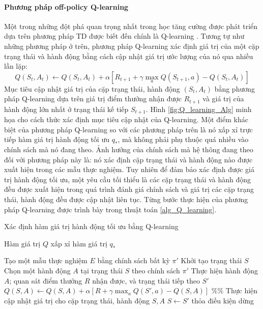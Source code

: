 \paragraph*{Phương pháp off-policy Q-learning}
 Một trong những đột phá quan trọng nhất trong học tăng cường được phát triển dựa trên phương pháp TD được biết đến chính là Q-learning \cite{sutton1998introduction}. Tương tự như những phương pháp ở trên, phương pháp Q-learning xác định giá trị của một cặp trạng thái và hành động bằng cách cập nhật giá trị ước lượng của nó qua nhiều lần lặp:
 \begin{equation}
	 Q(\mathit{S}_t, \mathit{A}_t) \leftarrow Q(\mathit{S}_t, \mathit{A}_t) + \alpha \left[\mathit{R}_{t+1} + \gamma\max_{a}Q(\mathit{S}_{t+1}, a) - Q(\mathit{S}_t, \mathit{A}_t)\right]
 \end{equation}
Mục tiêu cập nhật giá trị của cặp trạng thái, hành động $(\mathit{S}_{t}, \mathit{A}_{t})$ bằng phương pháp Q-learning dựa trên giá trị điểm thưởng nhận được $\mathit{R}_{t+1}$ và giá trị của hành động lớn nhất ở trạng thái kế tiếp $\mathit{S}_{t+1}$. Hình \ref{fig:Q_learning_Alg} minh họa cho cách thức xác định mục tiêu cập nhật của Q-learning. 
Một điểm khác biệt của phương pháp Q-learning so với các phương pháp trên là nó xấp xỉ trực tiếp hàm giá trị hành động tối ưu $q_*$, mà không phải phụ thuộc quá nhiều vào chính sách mà nó đang theo. Ảnh hưởng của chính sách mà hệ thông đang theo đối với phương pháp này là: nó xác định cặp trạng thái và hành động nào được xuất hiện trong các mẫu thực nghiệm. Tuy nhiên để đảm bảo xác định được giá trị hành động tối ưu, một yêu cầu tối thiểu là các cặp trạng thái và hành động đều được xuất hiện trong quá trình đánh giá chính sách và giá trị các cặp trạng thái, hành động đều được cập nhật liên tục. Từng bước thực hiện của phương pháp Q-learning được trình bày trong thuật toán \ref{alg_Q_learning}.
\begin{algorithm}
	\caption{Xác định hàm giá trị hành động tối ưu bằng Q-learning}
	\label{alg_Q_learning}
	\begin{algorithmic}[1]
		\renewcommand{\algorithmicrequire}{\textbf{Đầu vào:}}
		\renewcommand{\algorithmicensure}{\textbf{Đầu ra:}}
		\algnewcommand{}
		\algnewcommand\Operation{\item[\algorithmicoperation]}
		
		\Require
		\Ensure Hàm giá trị $Q$ xấp xỉ hàm giá trị $q_{*}$
		
		\Operation
		\Repeat
		\State Tạo một mẫu thực nghiệm $E$ bằng chính sách bất kỳ $\pi'$
		\State Khởi tạo trạng thái $S$
		\State Chọn một hành động $A$ tại trạng thái $S$ theo chính sách $\pi'$
		\State Thực hiện hành động $A$; quan sát điểm thưởng $R$ nhận được, và trạng thái tiếp theo $S'$
		\State $Q(S,A) \leftarrow Q(S,A) + \alpha \left[R + \gamma\max_{a}Q(S', a) - Q(S,A)\right]$ \%\% Thực hiện cập nhật giá trị cho cặp trạng thái, hành động $S,A$
		\State $S \leftarrow S'$
		\EndFor
		\Until thỏa điều kiện dừng
	\end{algorithmic}
\end{algorithm}

